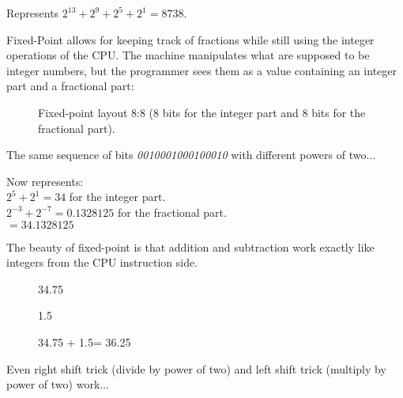 Represents $ 2^{13} + 2^9 + 2^5 + 2^1 =  8738 $.\\
 \par

Fixed-Point allows for keeping track of fractions while still using the integer operations of the CPU. The machine manipulates what are supposed to be integer numbers, but the programmer sees them as a value containing an integer part and a fractional part:\\
\par
\begin{figure}[H]
 \centering
  
 \caption{Fixed-point layout 8:8 (8 bits for the integer part and 8 bits for the fractional part).} \label{fig:mips}
\end{figure}
                                
The same sequence of bits \emph{0010001000100010} with different powers of two...
\begin{figure}[H]
 \centering
   
\end{figure} 

Now represents:\\

$ 2^5 + 2^1 = 34 $ for the integer part.\\
$ 2^{-3}+2^{-7} = 0.1328125 $ for the fractional part.\\
$ = 34.1328125$\\

\bigskip

The beauty of fixed-point is that addition and subtraction work exactly like integers from the CPU instruction side.\\




\par
\begin{figure}[H]
 \centering
   

   \caption{34.75} 
\end{figure} 

\begin{figure}[H]
 \centering
   
  \caption{1.5} 
\end{figure} 

\begin{figure}[H]
 \centering
   
  {\caption{34.75 + 1.5= 36.25}}
\end{figure} 
\par
 Even right shift trick (divide by power of two) and left shift trick (multiply by power of two) work...\\
 
